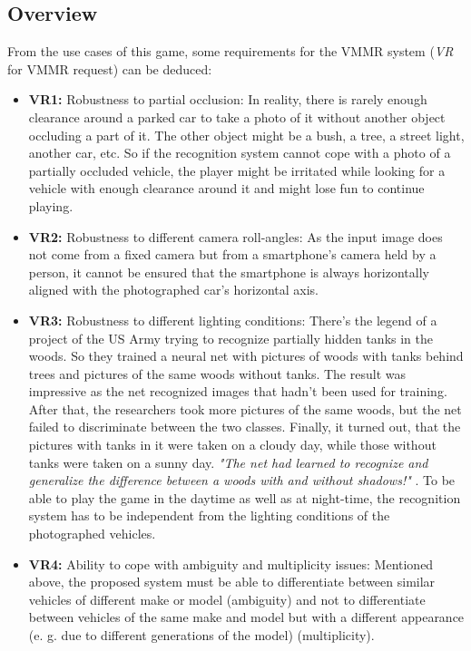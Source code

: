 \subsection{Overview}
From the use cases of this game, some requirements for the VMMR system (\emph{VR} for VMMR request) can be deduced:
\begin{itemize}
  \item\textbf{VR1:} Robustness to partial occlusion: In reality, there is rarely enough clearance around a parked car to take a photo of it without another object occluding a part of it. The other object might be a bush, a tree, a street light, another car, etc. So if the recognition system cannot cope with a photo of a partially occluded vehicle, the player might be irritated while looking for a vehicle with enough clearance around it and might lose fun to continue playing.
  \item\textbf{VR2:} Robustness to different camera roll-angles: As the input image does not come from a fixed camera but from a smartphone's camera held by a person, it cannot be ensured that the smartphone is always horizontally aligned with the photographed car's horizontal axis.
  \item\textbf{VR3:} Robustness to different lighting conditions: There's the legend of a project of the US Army trying to recognize partially hidden tanks in the woods. So they trained a neural net with pictures of woods with tanks behind trees and pictures of the same woods without tanks. The result was impressive as the net recognized images that hadn't been used for training. After that, the researchers took more pictures of the same woods, but the net failed to discriminate between the two classes. Finally, it turned out, that the pictures with tanks in it were taken on a cloudy day, while those without tanks were taken on a sunny day. \emph{"The net had learned to recognize and generalize the difference between a woods with and without shadows!"} \citep{dreyfus1992artificial}. To be able to play the game in the daytime as well as at night-time, the recognition system has to be independent from the lighting conditions of the photographed vehicles.
  \item\textbf{VR4:} Ability to cope with ambiguity and multiplicity issues: Mentioned above, the proposed system must be able to differentiate between similar vehicles of different make or model (ambiguity) and not to differentiate between vehicles of the same make and model but with a different appearance (e. g. due to different generations of the model) (multiplicity).
\end{itemize}
